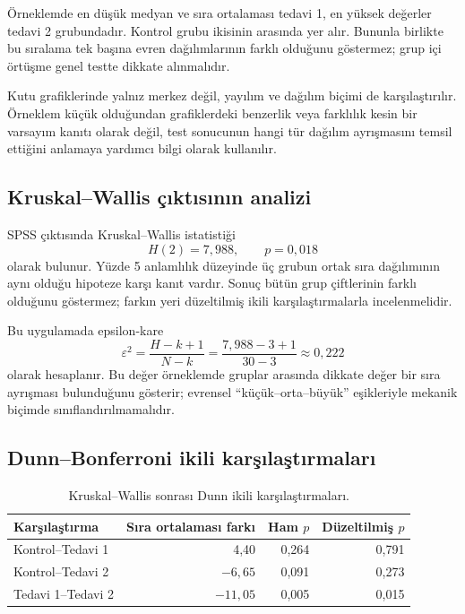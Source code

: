 Örneklemde en düşük medyan ve sıra ortalaması tedavi 1, en yüksek değerler
tedavi 2 grubundadır. Kontrol grubu ikisinin arasında yer alır. Bununla
birlikte bu sıralama tek başına evren dağılımlarının farklı olduğunu
göstermez; grup içi örtüşme genel testte dikkate alınmalıdır.

Kutu grafiklerinde yalnız merkez değil, yayılım ve dağılım biçimi de
karşılaştırılır. Örneklem küçük olduğundan grafiklerdeki benzerlik veya
farklılık kesin bir varsayım kanıtı olarak değil, test sonucunun hangi tür
dağılım ayrışmasını temsil ettiğini anlamaya yardımcı bilgi olarak kullanılır.

\subsection{Kruskal--Wallis çıktısının analizi}

SPSS çıktısında Kruskal--Wallis istatistiği
\[
H(2)=7{,}988,
\qquad p=0{,}018
\]
olarak bulunur. Yüzde 5 anlamlılık düzeyinde üç grubun ortak sıra dağılımının
aynı olduğu hipoteze karşı kanıt vardır. Sonuç bütün grup çiftlerinin farklı
olduğunu göstermez; farkın yeri düzeltilmiş ikili karşılaştırmalarla
incelenmelidir.

Bu uygulamada epsilon-kare
\[
\varepsilon^2
=\frac{H-k+1}{N-k}
=\frac{7{,}988-3+1}{30-3}
\approx0{,}222
\]
olarak hesaplanır. Bu değer örneklemde gruplar arasında dikkate değer bir sıra
ayrışması bulunduğunu gösterir; evrensel ``küçük--orta--büyük'' eşikleriyle
mekanik biçimde sınıflandırılmamalıdır.

\subsection{Dunn--Bonferroni ikili karşılaştırmaları}

\begin{table}[htbp]
\centering
\caption{Kruskal--Wallis sonrası Dunn ikili karşılaştırmaları.}
\begin{tabular}{@{}lrrr@{}}
\toprule
Karşılaştırma & Sıra ortalaması farkı & Ham $p$ & Düzeltilmiş $p$ \\
\midrule
Kontrol--Tedavi 1 & 4,40 & 0,264 & 0,791 \\
Kontrol--Tedavi 2 & $-6{,}65$ & 0,091 & 0,273 \\
Tedavi 1--Tedavi 2 & $-11{,}05$ & 0,005 & 0,015 \\
\bottomrule
\end{tabular}
\end{table}

